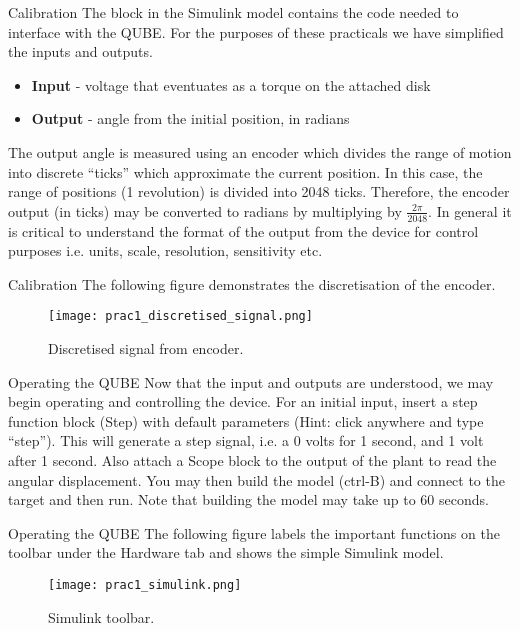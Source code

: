 \documentclass[9pt]{beamer-control}
\begin{document}

\begin{frame}{Calibration}
The block in the Simulink model contains the code needed to interface with the QUBE. For the purposes of these practicals we have simplified the inputs and outputs. 

\begin{itemize}
	\item \textbf{Input} - voltage that eventuates as a torque on the attached disk
	\item \textbf{Output} - angle from the initial position, in radians
\end{itemize}

The output angle is measured using an encoder which divides the range of motion into discrete ``ticks” which approximate the current position. In this case, the range of positions (1 revolution) is divided into 2048 ticks. Therefore, the encoder output (in ticks) may be converted to radians by multiplying by $\tfrac{2\pi}{2048}$. In general it is critical to understand the format of the output from the device for control purposes i.e. units, scale, resolution, sensitivity etc. 


\end{frame}

\begin{frame}{Calibration}
The following figure demonstrates the discretisation of the encoder.
\begin{figure}
\centering
\texttt{[image: prac1\_discretised\_signal.png]}
\caption{Discretised signal from encoder.}
\end{figure}

\end{frame}



\begin{frame}{Operating the QUBE}
	Now that the input and outputs are understood, we may begin operating and controlling the device. For an initial input, insert a step function block (Step) with default parameters (Hint: click anywhere and type “step”). This will generate a step signal, i.e. a 0 volts for 1 second, and 1 volt after 1 second. Also attach a Scope block to the output of the plant to read the angular displacement. You may then build the model (ctrl-B) and connect to the target and then run. Note that building the model may take up to 60 seconds. 
\end{frame}

\begin{frame}{Operating the QUBE}
	The following figure labels the important functions on the toolbar under the Hardware tab and shows the simple Simulink model.
\begin{figure}
	\centering
	\texttt{[image: prac1\_simulink.png]}
	\caption{Simulink toolbar.}
\end{figure}
\end{frame}
\end{document}
